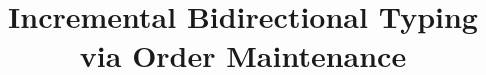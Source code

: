 \documentclass[acmsmall,dvipsnames,10pt]{acmart}\settopmatter{printfolios=true}
\begin{document}
\title{Incremental Bidirectional Typing via Order Maintenance}







\maketitle











\newpage 





% 
\end{document}
